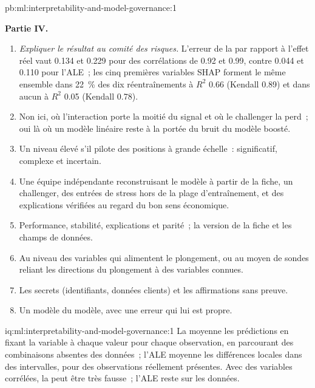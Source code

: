 \begin{solution}{pb:ml:interpretability-and-model-governance:1}
\begin{enumerate}[resume]
\end{enumerate}
\textbf{Partie IV.}
\begin{enumerate}[resume]
\item \emph{Expliquer le résultat au comité des risques.} L'erreur de la  par rapport à l'effet réel vaut 0.134 et 0.229 pour des
corrélations de 0.92 et 0.99, contre 0.044 et 0.110 pour l'ALE~; les cinq premières variables SHAP forment le même ensemble dans 22~\% des dix réentraînements
à $R^2$ 0.66 (Kendall 0.89) et dans aucun à $R^2$ 0.05 (Kendall 0.78).
\item Non ici, où l'interaction porte la moitié du signal et où le challenger la perd~; oui là où un modèle linéaire reste
à la portée du bruit du modèle boosté.
\item Un niveau élevé s'il pilote des positions à grande échelle~: significatif, complexe et incertain.
\item Une équipe indépendante reconstruisant le modèle à partir de la fiche, un challenger, des entrées de stress hors de la plage d'entraînement, et
des explications vérifiées au regard du bon sens économique.
\item Performance, stabilité, explications et parité~; la version de la fiche et les champs de données.
\item Au niveau des variables qui alimentent le plongement, ou au moyen de sondes reliant les directions du plongement à des variables connues.
\item Les secrets (identifiants, données clients) et les affirmations sans preuve.
\item Un modèle du modèle, avec une erreur qui lui est propre.
\end{enumerate}
\end{solution}

\begin{solution}{iq:ml:interpretability-and-model-governance:1}
La  moyenne les prédictions en fixant la variable à chaque valeur pour chaque observation, en parcourant des combinaisons
absentes des données~; l'ALE moyenne les différences locales dans des intervalles, pour des observations réellement présentes. Avec des
variables corrélées, la  peut être très fausse~; l'ALE reste sur les données.
\end{solution}

